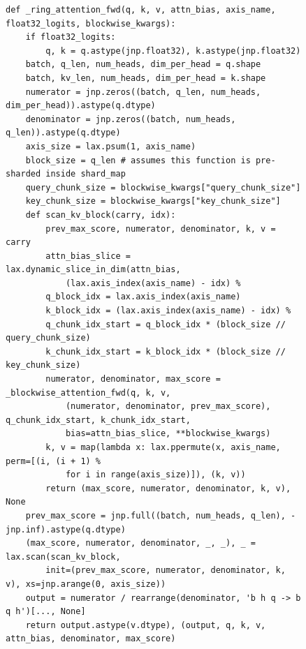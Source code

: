 \documentclass{article}
\begin{document}
\begin{figure}[!htbp]
\begin{verbatim}
def _ring_attention_fwd(q, k, v, attn_bias, axis_name, float32_logits, blockwise_kwargs):
    if float32_logits:
        q, k = q.astype(jnp.float32), k.astype(jnp.float32)
    batch, q_len, num_heads, dim_per_head = q.shape
    batch, kv_len, num_heads, dim_per_head = k.shape
    numerator = jnp.zeros((batch, q_len, num_heads, dim_per_head)).astype(q.dtype)
    denominator = jnp.zeros((batch, num_heads, q_len)).astype(q.dtype)
    axis_size = lax.psum(1, axis_name)
    block_size = q_len # assumes this function is pre-sharded inside shard_map
    query_chunk_size = blockwise_kwargs["query_chunk_size"]
    key_chunk_size = blockwise_kwargs["key_chunk_size"]
    def scan_kv_block(carry, idx):
        prev_max_score, numerator, denominator, k, v = carry
        attn_bias_slice = lax.dynamic_slice_in_dim(attn_bias,
            (lax.axis_index(axis_name) - idx) %
        q_block_idx = lax.axis_index(axis_name)
        k_block_idx = (lax.axis_index(axis_name) - idx) %
        q_chunk_idx_start = q_block_idx * (block_size // query_chunk_size)
        k_chunk_idx_start = k_block_idx * (block_size // key_chunk_size)
        numerator, denominator, max_score = _blockwise_attention_fwd(q, k, v,
            (numerator, denominator, prev_max_score), q_chunk_idx_start, k_chunk_idx_start,
            bias=attn_bias_slice, **blockwise_kwargs)
        k, v = map(lambda x: lax.ppermute(x, axis_name, perm=[(i, (i + 1) %
            for i in range(axis_size)]), (k, v))
        return (max_score, numerator, denominator, k, v), None
    prev_max_score = jnp.full((batch, num_heads, q_len), -jnp.inf).astype(q.dtype)
    (max_score, numerator, denominator, _, _), _ = lax.scan(scan_kv_block,
        init=(prev_max_score, numerator, denominator, k, v), xs=jnp.arange(0, axis_size))
    output = numerator / rearrange(denominator, 'b h q -> b q h')[..., None]
    return output.astype(v.dtype), (output, q, k, v, attn_bias, denominator, max_score)


\end{verbatim}
\end{figure}
\end{document}
